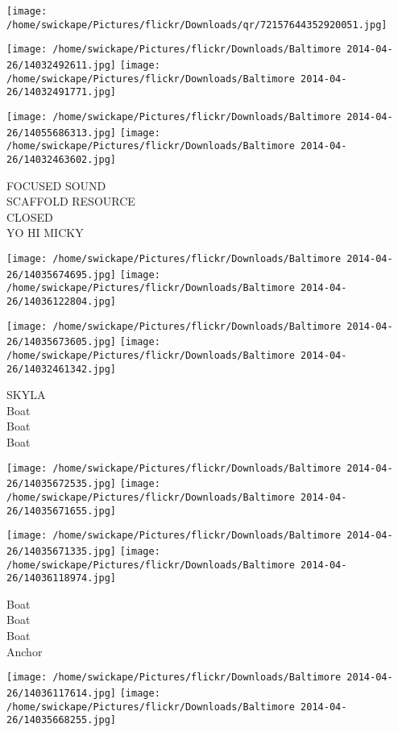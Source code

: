 \documentclass[10pt,letterpaper]{article}
\begin{document}
\texttt{[image: /home/swickape/Pictures/flickr/Downloads/qr/72157644352920051.jpg]}
\pagebreak

\texttt{[image: /home/swickape/Pictures/flickr/Downloads/Baltimore 2014-04-26/14032492611.jpg]}
\texttt{[image: /home/swickape/Pictures/flickr/Downloads/Baltimore 2014-04-26/14032491771.jpg]}

\texttt{[image: /home/swickape/Pictures/flickr/Downloads/Baltimore 2014-04-26/14055686313.jpg]}
\texttt{[image: /home/swickape/Pictures/flickr/Downloads/Baltimore 2014-04-26/14032463602.jpg]}

FOCUSED SOUND\\
SCAFFOLD RESOURCE\\
CLOSED\\
YO HI MICKY
\pagebreak

\texttt{[image: /home/swickape/Pictures/flickr/Downloads/Baltimore 2014-04-26/14035674695.jpg]}
\texttt{[image: /home/swickape/Pictures/flickr/Downloads/Baltimore 2014-04-26/14036122804.jpg]}

\texttt{[image: /home/swickape/Pictures/flickr/Downloads/Baltimore 2014-04-26/14035673605.jpg]}
\texttt{[image: /home/swickape/Pictures/flickr/Downloads/Baltimore 2014-04-26/14032461342.jpg]}

SKYLA\\
Boat\\
Boat\\
Boat
\pagebreak

\texttt{[image: /home/swickape/Pictures/flickr/Downloads/Baltimore 2014-04-26/14035672535.jpg]}
\texttt{[image: /home/swickape/Pictures/flickr/Downloads/Baltimore 2014-04-26/14035671655.jpg]}

\texttt{[image: /home/swickape/Pictures/flickr/Downloads/Baltimore 2014-04-26/14035671335.jpg]}
\texttt{[image: /home/swickape/Pictures/flickr/Downloads/Baltimore 2014-04-26/14036118974.jpg]}

Boat\\
Boat\\
Boat\\
Anchor
\pagebreak

\texttt{[image: /home/swickape/Pictures/flickr/Downloads/Baltimore 2014-04-26/14036117614.jpg]}
\texttt{[image: /home/swickape/Pictures/flickr/Downloads/Baltimore 2014-04-26/14035668255.jpg]}
\end{document}

